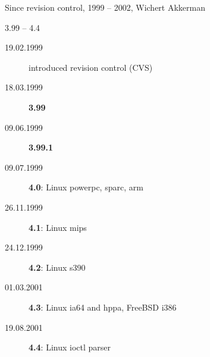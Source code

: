 \documentclass[unicode]{beamer}
\begin{document}
\begin{frame}{Since revision control, 1999 -- 2002, Wichert Akkerman}
	\begin{block}{3.99 -- 4.4}
	\begin{description}
		\item[19.02.1999] introduced revision control (CVS)
		\item[18.03.1999] {\bf 3.99}
		\item[09.06.1999] {\bf 3.99.1}
		\item[09.07.1999] {\bf 4.0}: Linux powerpc, sparc, arm
		\item[26.11.1999] {\bf 4.1}: Linux mips
		\item[24.12.1999] {\bf 4.2}: Linux s390
		\item[01.03.2001] {\bf 4.3}: Linux ia64 and hppa, FreeBSD i386
		\item[19.08.2001] {\bf 4.4}: Linux ioctl parser
	\end{description}
	\end{block}
\end{frame}
\end{document}
